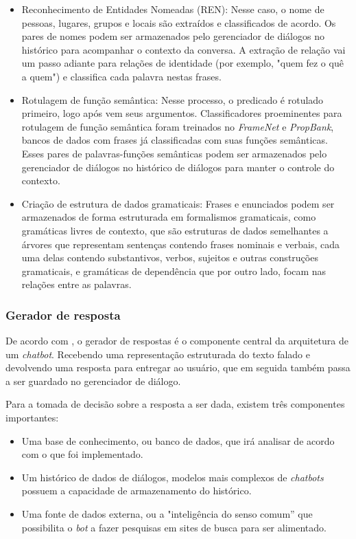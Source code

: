 \documentclass[
	12pt,				%
	oneside,
	a4paper,			%
	english,			%
	french,				%
	spanish,			%
	brazil				%
	]{abntex2}
\begin{document}
\begin{itemize}
	\item Reconhecimento de Entidades Nomeadas (REN): Nesse caso, o nome de pessoas, lugares, grupos e locais são extraídos e classificados de acordo. Os pares de nomes podem ser armazenados pelo gerenciador de diálogos no histórico para acompanhar o contexto da conversa. A extração de relação vai um passo adiante para relações de identidade (por exemplo, "quem fez o quê a quem") e classifica cada palavra nestas frases.
	\item Rotulagem de função semântica: Nesse processo, o predicado é rotulado primeiro, logo após vem seus argumentos. Classificadores proeminentes para rotulagem de função semântica foram treinados no \emph{FrameNet} e \emph{PropBank}, bancos de dados com frases já classificadas com suas funções semânticas. Esses pares de palavras-funções semânticas podem ser armazenados pelo gerenciador de diálogos no histórico de diálogos para manter o controle do contexto.
	\item Criação de estrutura de dados gramaticais: Frases e enunciados podem ser armazenados de forma estruturada em formalismos gramaticais, como gramáticas livres de contexto, que são estruturas de dados semelhantes a árvores que representam sentenças contendo frases nominais e verbais, cada uma delas contendo substantivos, verbos, sujeitos e outras construções gramaticais, e gramáticas de dependência que por outro lado, focam nas relações entre as palavras. 
\end{itemize}


\subsubsection{Gerador de resposta}
De acordo com \textcite{response-generator}, o gerador de respostas é o componente central da arquitetura de um \emph{chatbot}. Recebendo uma representação estruturada do texto falado e devolvendo uma resposta para entregar ao usuário, que em seguida também passa a ser guardado no gerenciador de diálogo.

Para a tomada de decisão sobre a resposta a ser dada, existem três componentes importantes:
\begin{itemize}
	\item Uma base de conhecimento, ou banco de dados, que irá analisar de acordo com o que foi implementado.
	\item Um histórico de dados de diálogos, modelos mais complexos de \emph{chatbots} possuem a capacidade de armazenamento do histórico.
	\item Uma fonte de dados externa, ou a "inteligência do senso comum” que possibilita o \emph{bot} a fazer pesquisas em sites de busca para ser alimentado.
\end{itemize}
\end{document}
